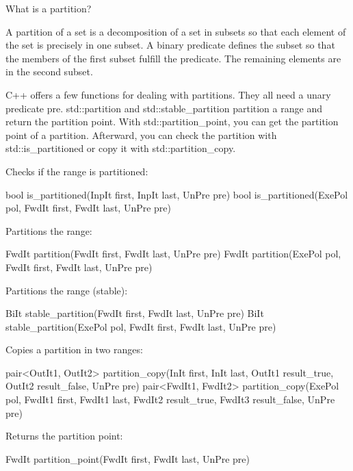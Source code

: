 

\begin{myTip}{What is a partition?}

A partition of a set is a decomposition of a set in subsets so that each element of the set is precisely in one subset. A binary predicate defines the subset so that the members of the first subset fulfill the predicate. The remaining elements are in the second subset.
\end{myTip}

C++ offers a few functions for dealing with partitions. They all need a unary predicate pre. std::partition and std::stable\_partition partition a range and return the partition point. With std::partition\_point, you can get the partition point of a partition. Afterward, you can check the partition with std::is\_partitioned or copy it with std::partition\_copy.

Checks if the range is partitioned:

\begin{cpp}
bool is_partitioned(InpIt first, InpIt last, UnPre pre)
bool is_partitioned(ExePol pol, FwdIt first, FwdIt last, UnPre pre)
\end{cpp}

Partitions the range:

\begin{cpp}
FwdIt partition(FwdIt first, FwdIt last, UnPre pre)
FwdIt partition(ExePol pol, FwdIt first, FwdIt last, UnPre pre)
\end{cpp}

Partitions the range (stable):

\begin{cpp}
BiIt stable_partition(FwdIt first, FwdIt last, UnPre pre)
BiIt stable_partition(ExePol pol, FwdIt first, FwdIt last, UnPre pre)
\end{cpp}

Copies a partition in two ranges:

\begin{cpp}
pair<OutIt1, OutIt2> partition_copy(InIt first, InIt last,
					 OutIt1 result_true, OutIt2 result_false, UnPre pre)
pair<FwdIt1, FwdIt2> partition_copy(ExePol pol, FwdIt1 first, FwdIt1 last,
					 FwdIt2 result_true, FwdIt3 result_false, UnPre pre)
\end{cpp}

Returns the partition point:

\begin{cpp}
FwdIt partition_point(FwdIt first, FwdIt last, UnPre pre)
\end{cpp}

